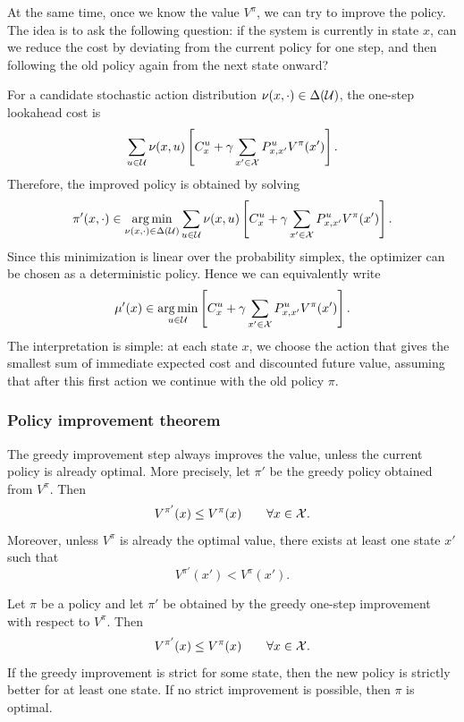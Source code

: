At the same time, once we know the value \(V^\pi\), we can try to improve the policy. The idea
is to ask the following question: if the system is currently in state \(x\), can we reduce the cost
by deviating from the current policy for one step, and then following the old policy again from
the next state onward?

For a candidate stochastic action distribution \(\nu(x,\cdot)\in\Delta(\mathcal{U})\), the one-step
lookahead cost is
\[
\sum_{u\in\mathcal{U}}\nu(x,u)
\left[
C_x^u
+
\gamma\sum_{x'\in\mathcal{X}}P^u_{x,x'}V^\pi(x')
\right].
\]
Therefore, the improved policy is obtained by solving
\[
\pi'(x,\cdot)
\in
\operatorname*{arg\,min}_{\nu(x,\cdot)\in\Delta(\mathcal{U})}
\sum_{u\in\mathcal{U}}\nu(x,u)
\left[
C_x^u
+
\gamma\sum_{x'\in\mathcal{X}}P^u_{x,x'}V^\pi(x')
\right].
\]
Since this minimization is linear over the probability simplex, the optimizer can be chosen as
a deterministic policy. Hence we can equivalently write
\[
\mu'(x)
\in
\operatorname*{arg\,min}_{u\in\mathcal{U}}
\left[
C_x^u
+
\gamma\sum_{x'\in\mathcal{X}}P^u_{x,x'}V^\pi(x')
\right].
\]
The interpretation is simple: at each state \(x\), we choose the action that gives the smallest
sum of immediate expected cost and discounted future value, assuming that after this first
action we continue with the old policy \(\pi\).

\subsubsection{Policy improvement theorem}

The greedy improvement step always improves the value, unless the current policy is already
optimal. More precisely, let \(\pi'\) be the greedy policy obtained from \(V^\pi\). Then
\[
V^{\pi'}(x)
\le
V^\pi(x)
\qquad
\forall x\in\mathcal{X}.
\]
Moreover, unless \(V^\pi\) is already the optimal value, there exists at least one state \(x'\)
such that
\[
V^{\pi'}(x')
<
V^\pi(x').
\]

\begin{theorembox}
Let \(\pi\) be a policy and let \(\pi'\) be obtained by the greedy one-step improvement with
respect to \(V^\pi\). Then
\[
V^{\pi'}(x)\le V^\pi(x)
\qquad
\forall x\in\mathcal{X}.
\]
If the greedy improvement is strict for some state, then the new policy is strictly better for
at least one state. If no strict improvement is possible, then \(\pi\) is optimal.
\end{theorembox}

